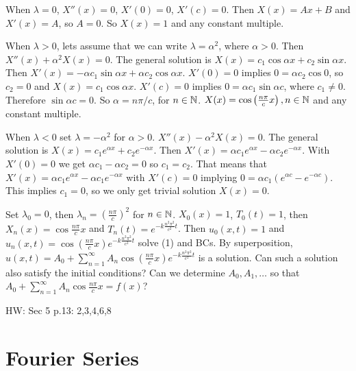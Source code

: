 \documentclass[]{article}
\begin{document}
When $\lambda=0$, $X''(x)=0$, $X'(0)=0$, $X'(c)=0$. Then $X(x)=Ax+B$ and $X'(x)=A$, so $A=0$. So $X(x)=1$ and any constant multiple.

When $\lambda>0$, lets assume that we can write $\lambda=\alpha^2$, where $\alpha>0$. Then $X''(x)+\alpha^2 X(x)=0$. The general solution is $X(x)=c_1 \cos{\alpha x} + c_2 \sin{\alpha x}$. Then $X'(x)=-\alpha c_1 \sin{\alpha x}+ \alpha c_2 \cos{\alpha x}$. $X'(0)=0$ implies $0=\alpha c_2 \cos{0}$, so $c_2=0$ and $X(x)=c_1 \cos{\alpha x}$. $X'(c)=0$ implies $0=\alpha c_1 \sin{\alpha c}$, where $c_1\neq 0$. Therefore $\sin{\alpha c}=0$. So $\alpha=n\pi /c$, for $n\in\mathbb{N}$.
$X(x)=\cos\left(\frac{n\pi}{c}x\right),n\in\mathbb{N}$ and any constant multiple.

When $\lambda<0$ set $\lambda=-\alpha^2$ for $\alpha>0$. $X''(x)-\alpha^2 X(x)=0$. The general solution is $X(x)= c_1 e^{\alpha x} + c_2 e^{-\alpha x}$. Then $X'(x)=\alpha c_1 e^{\alpha x} - \alpha c_2 e^{-\alpha x}$. With $X'(0)=0$ we get $\alpha c_1-\alpha c_2 = 0$ so $c_1=c_2$. That means that $X'(x)=\alpha c_1 e^{\alpha x} - \alpha c_1 e^{-\alpha x}$ with $X'(c)=0$ implying $0=\alpha c_1(e^{\alpha c}-e^{-\alpha c})$. This implies $c_1=0$, so we only get trivial solution $X(x)=0$.

Set $\lambda_0=0$, then $\lambda_n=\left(\frac{n\pi}{c}\right)^2$ for $n\in\mathbb{N}$. $X_0(x)=1$, $T_0(t)=1$, then $X_n(x)=\cos{\frac{n\pi}{c}x}$ and $T_n(t)=e^{-k\frac{n^2\pi^2}{c^2}t}$. Then $u_0(x,t)=1$ and $u_n(x,t)=\cos\left(\frac{n\pi}{c}x\right)e^{-k\frac{n^2\pi^2}{c^2}t}$ solve (1) and BCs. By superposition, $u(x,t)=A_0+\sum_{n=1}^{\infty} A_n \cos\left(\frac{n\pi}{c}x\right)e^{-k\frac{n^2\pi^2}{c^2}t}$ is a solution. Can such a solution also satisfy the initial conditions? Can we determine $A_0,A_1,\dots$ so that $A_0 + \sum_{n=1}^{\infty} A_n \cos\frac{n\pi}{c}x = f(x)$?

HW: Sec 5 p.13: 2,3,4,6,8

\section{Fourier Series}
\end{document}
